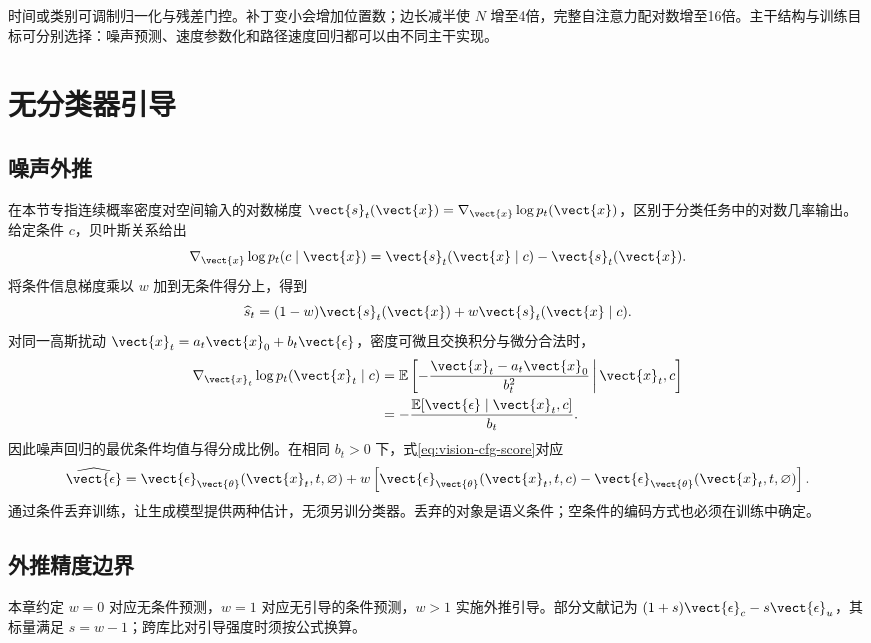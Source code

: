 \documentclass[../textbook.tex]{subfiles}
\begin{document}
时间或类别可调制归一化与残差门控。补丁变小会增加位置数；边长减半使 $N$ 增至4倍，完整自注意力配对数增至16倍。主干结构与训练目标可分别选择：噪声预测、速度参数化和路径速度回归都可以由不同主干实现。

\section{无分类器引导}

\subsection{噪声外推}
在本节专指连续概率密度对空间输入的对数梯度 $\vect{s}_t(\vect{x})=\nabla_{\vect{x}}\log p_t(\vect{x})$，区别于分类任务中的对数几率输出。给定条件 $c$，贝叶斯关系给出
\begin{equation}
 \nabla_{\vect{x}}\log p_t(c\mid \vect{x})=\vect{s}_t(\vect{x}\mid c)-\vect{s}_t(\vect{x}).
\end{equation}
将条件信息梯度乘以 $w$ 加到无条件得分上，得到
\begin{equation}
 \widehat s_t=(1-w)\vect{s}_t(\vect{x})+w \vect{s}_t(\vect{x}\mid c).
 \label{eq:vision-cfg-score}
\end{equation}
对同一高斯扰动 $\vect{x}_t=a_t\vect{x}_0+b_t\vect{\epsilon}$，密度可微且交换积分与微分合法时，
\begin{align}
 \nabla_{\vect{x}_t}\log p_t(\vect{x}_t\mid c)
 &=\mathbb E\left[-\frac{\vect{x}_t-a_t\vect{x}_0}{b_t^2}\,\middle|\,\vect{x}_t,c\right]\\
 &=-\frac{\mathbb E[\vect{\epsilon}\mid \vect{x}_t,c]}{b_t}.
\end{align}
因此噪声回归的最优条件均值与得分成比例。在相同 $b_t>0$ 下，式\eqref{eq:vision-cfg-score}对应
\begin{equation}
 \widehat{\vect{\epsilon}}=\vect{\epsilon}_{\vect{\theta}}(\vect{x}_t,t,\varnothing)
 +w\left[\vect{\epsilon}_{\vect{\theta}}(\vect{x}_t,t,c)-\vect{\epsilon}_{\vect{\theta}}(\vect{x}_t,t,\varnothing)\right].
 \label{eq:vision-cfg-noise}
\end{equation}
通过条件丢弃训练，让生成模型提供两种估计，无须另训分类器\cite{ho2022cfg}。丢弃的对象是语义条件；空条件的编码方式也必须在训练中确定。

\subsection{外推精度边界}
本章约定 $w=0$ 对应无条件预测，$w=1$ 对应无引导的条件预测，$w>1$ 实施外推引导。部分文献记为 $(1+s)\vect{\epsilon}_c-s\vect{\epsilon}_u$，其标量满足 $s=w-1$；跨库比对引导强度时须按公式换算。
\end{document}
